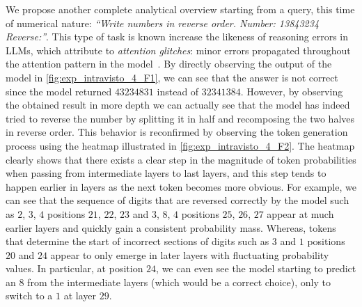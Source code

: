 We propose another complete analytical overview starting from a query, this time of numerical nature: \emph{``Write numbers in reverse order. Number: 13843234 Reverse:''}.
This type of task is known increase the likeness of reasoning errors in LLMs, which  attribute to \emph{attention glitches}: minor errors propagated throughout the attention pattern in the model~\cite{liu2023}.
By directly observing the output of the model in \cref{fig:exp_intravisto_4_F1}, we can see that the answer is not correct since the model returned $43234831$ instead of $32341384$.
However, by observing the obtained result in more depth we can actually see that the model has indeed tried to reverse the number by splitting it in half and recomposing the two halves in reverse order.
This behavior is reconfirmed by observing the token generation process using the heatmap illustrated in \cref{fig:exp_intravisto_4_F2}.
The heatmap clearly shows that there exists a clear step in the magnitude of token probabilities when passing from intermediate layers to last layers, and this step  tends to happen earlier in layers as the next token becomes more obvious.
For example, we can see that the sequence of digits that are reversed correctly by the model such as $2$, $3$, $4$  positions $21$, $22$, $23$ and $3$, $8$, $4$  positions $25$, $26$, $27$ appear at much earlier layers and quickly gain a consistent probability mass.
Whereas, tokens that determine the start of incorrect sections of digits such as $3$ and $1$  positions $20$ and $24$ appear to only emerge in later layers with fluctuating probability values.
In particular,  at position $24$, we can even see the model starting to predict an $8$ from the intermediate layers (which would be a correct choice), only to switch to a $1$ at layer $29$.

\begin{figure}[t!]
    \centering
    \quad
    \caption{}
    \label{fig:exp_intravisto_4_F}
\end{figure}

